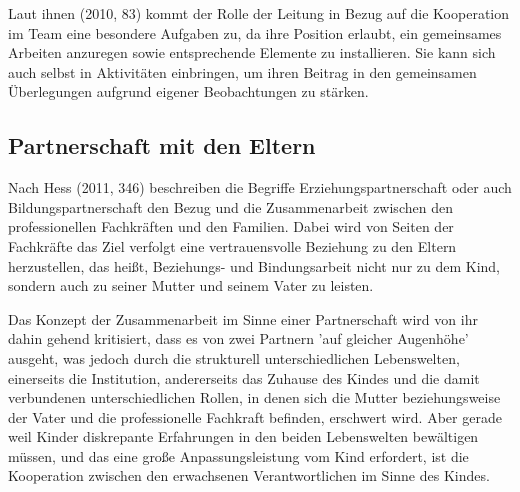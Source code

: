 Laut ihnen (2010, 83) kommt der Rolle der Leitung in Bezug auf die Kooperation im Team eine besondere Aufgaben zu, da ihre Position erlaubt, ein gemeinsames Arbeiten anzuregen sowie entsprechende Elemente zu installieren. Sie kann sich auch selbst in Aktivitäten einbringen, um ihren Beitrag in den gemeinsamen Überlegungen aufgrund eigener Beobachtungen zu stärken.

\subsection{Partnerschaft mit den Eltern}\label{Partnerschaft mit Eltern}
Nach Hess (2011, 346) beschreiben die Begriffe Erziehungspartnerschaft oder auch Bildungspartnerschaft den Bezug und die Zusammenarbeit zwischen den professionellen Fachkräften und den Familien. Dabei wird von Seiten der Fachkräfte das Ziel verfolgt eine vertrauensvolle Beziehung zu den Eltern herzustellen, das heißt, Beziehungs- und Bindungsarbeit nicht nur zu dem Kind, sondern auch zu seiner Mutter und seinem Vater zu leisten. 

Das Konzept der Zusammenarbeit im Sinne einer Partnerschaft wird von ihr dahin gehend kritisiert, dass es von zwei Partnern 'auf gleicher Augenhöhe' ausgeht, was jedoch durch die strukturell unterschiedlichen Lebenswelten, einerseits die Institution, andererseits das Zuhause des Kindes und die damit verbundenen unterschiedlichen Rollen, in denen sich die Mutter beziehungsweise der Vater und die professionelle Fachkraft befinden, erschwert wird. Aber gerade weil Kinder diskrepante Erfahrungen in den beiden Lebenswelten bewältigen müssen, und das eine große Anpassungsleistung vom Kind erfordert, ist die Kooperation zwischen den erwachsenen Verantwortlichen im Sinne des Kindes. 

